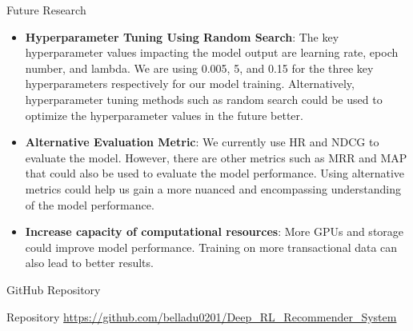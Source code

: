\documentclass{beamer}
\begin{document}
\begin{frame}{Future Research}
\begin{itemize}
\item \textbf{Hyperparameter Tuning Using Random Search}: The key hyperparameter values impacting the model output are learning rate, epoch number, and lambda. We are using 0.005, 5, and 0.15 for the three key hyperparameters respectively for our model training. Alternatively, hyperparameter tuning methods such as random search could be used to optimize the hyperparameter values in the future better.

\item \textbf{Alternative Evaluation Metric}: We currently use HR and NDCG to evaluate the model. However, there are other metrics such as MRR and MAP that could also be used to evaluate the model performance. Using alternative metrics could help us gain a more nuanced and encompassing understanding of the model performance.

\item \textbf{Increase capacity of computational resources}: More GPUs and storage could improve model performance. Training on more transactional data can also lead to better results.
\end{itemize}
\end{frame}


\begin{frame}{GitHub Repository}
  \begin{block}{Repository}
    \url{https://github.com/belladu0201/Deep_RL_Recommender_System}
  \end{block}
\end{frame}
\end{document}
